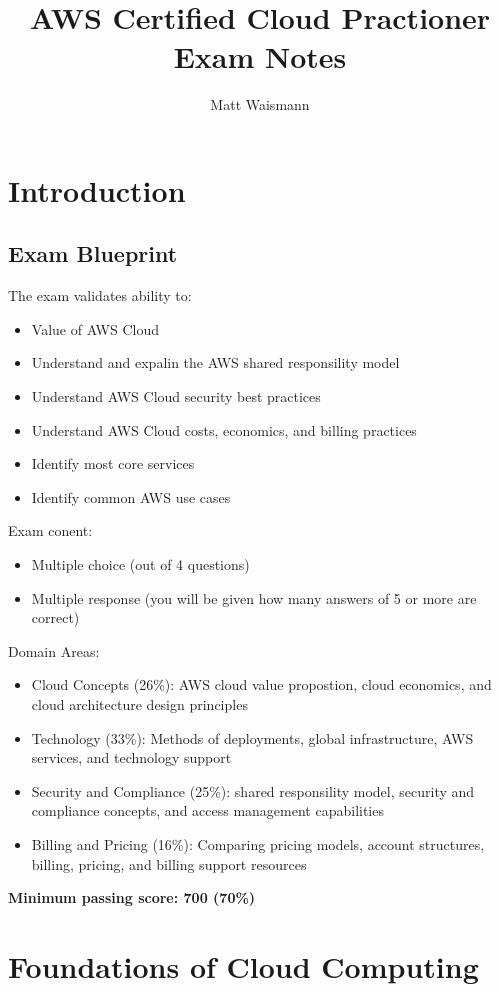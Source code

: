 \documentclass{article}%
\title{AWS Certified Cloud Practioner Exam Notes}
\author{Matt Waismann}
\begin{document}
\maketitle
\section{Introduction}
\subsection{Exam Blueprint}
The exam validates ability to:
\begin{itemize}
    \item Value of AWS Cloud
    \item Understand and expalin the AWS shared responsility model
    \item Understand AWS Cloud security best practices
    \item Understand AWS Cloud costs, economics, and billing practices
    \item Identify most core services
    \item Identify common AWS use cases
\end{itemize}
Exam conent:
\begin{itemize}
    \item Multiple choice (out of 4 questions)
    \item Multiple response (you will be given how many answers of 5 or more are correct)
\end{itemize}
Domain Areas:
\begin{itemize}
    \item Cloud Concepts (26\%): AWS cloud value propostion, cloud economics, and cloud architecture design principles
    \item Technology (33\%): Methods of deployments, global infrastructure, AWS services, and technology support
    \item Security and Compliance (25\%): shared responsility model, security and compliance concepts, and access management capabilities
    \item Billing and Pricing (16\%): Comparing pricing models, account structures, billing, pricing, and billing support resources
\end{itemize}
\textbf{Minimum passing score: 700 (70\%)}

\section{Foundations of Cloud Computing}
\end{document}

